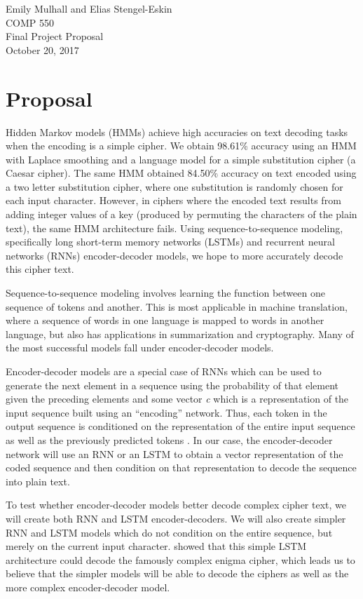 \documentclass{article}
\begin{document}
\noindent Emily Mulhall and Elias Stengel-Eskin\\
COMP 550\\
Final Project Proposal\\
October 20, 2017\\

\section{Proposal}
Hidden Markov models (HMMs) achieve high accuracies on text decoding tasks when the encoding is a simple cipher. We obtain 98.61\% accuracy using an HMM with Laplace smoothing and a language model for a simple substitution cipher (a Caesar cipher). The same HMM obtained 84.50\% accuracy on text encoded using a two letter substitution cipher, where one substitution is randomly chosen for each input character. However, in ciphers where the encoded text results from adding integer values of a key (produced by permuting the characters of the plain text), the same HMM architecture fails. Using sequence-to-sequence modeling, specifically long short-term memory networks (LSTMs) and recurrent neural networks (RNNs) encoder-decoder models, we hope to more accurately decode this cipher text.

Sequence-to-sequence modeling involves learning the function between one sequence of tokens and another. This is most applicable in machine translation, where a sequence of words in one language is mapped to words in another language, but also has applications in summarization and cryptography. Many of the most successful models fall under encoder-decoder models. 

Encoder-decoder models are a special case of RNNs which can be used to generate the next element in a sequence using the probability of that element given the preceding elements and some vector \textit{c} which is a representation of the input sequence built using an ``encoding'' network. Thus, each token in the output sequence is conditioned on the representation of the entire input sequence as well as the previously predicted tokens \citep{goldberg.y:2017}.  In our case, the  encoder-decoder network will use an RNN or an LSTM to obtain a vector representation of the coded sequence and then condition on that representation to decode the sequence into plain text. 

To test whether encoder-decoder models better decode complex cipher text, we will create both RNN and LSTM encoder-decoders. We will also create simpler RNN and LSTM models which do not condition on the entire sequence, but merely on the current input character. \citet{greydanus.s:2017} showed that this simple LSTM architecture could decode the famously complex enigma cipher, which leads us to believe that the simpler models will be able to decode the ciphers as well as the more complex encoder-decoder model. 
\end{document}
